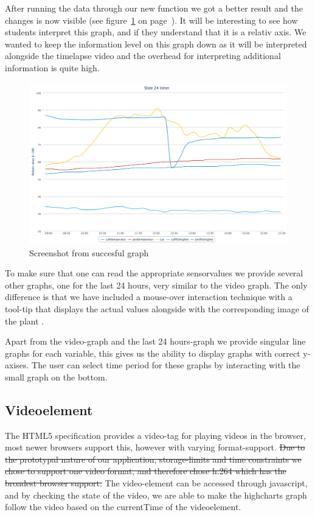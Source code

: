 After running the data through our new function we got a better result and the changes is now visible (see figure~\ref{fig:goodgraph} on page~\pageref{fig:goodgraph}). It will be interesting to see how students interpret this graph, and if they understand that it is a relativ axis. We wanted to keep the information level on this graph down as it will be interpreted alongside the timelapse video and the overhead for interpreting additional information is quite high.  

\begin{figure}
\centering
\includegraphics[width=1\textwidth]{img/interface/goodgraph.png}
\caption{Screenshot from succesful graph}
\label{fig:goodgraph}
\end{figure}

To make sure that one can read the appropriate sensorvalues we provide several other graphs, one for the last 24 hours, very similar to the video graph. The only difference is that we have included a mouse-over interaction technique with a tool-tip that displays the actual values alongside with the corresponding image of the plant \citep[p.254]{kluge2010simulation}.

Apart from the video-graph and the last 24 hours-graph we provide singular line graphs for each variable, this gives us the ability to display graphs with correct y-axises. The user can select time period for these graphs by interacting with the small graph on the bottom. 

\subsection{Videoelement}
The HTML5 specification provides a video-tag for playing videos in the browser, most newer browsers support this, however with varying format-support. \sout{Due to the prototypal nature of our application, storage-limits and time constraints we chose to support one video format, and therefore chose h.264 which has the broadest browser support.} The video-element can be accessed through javascript, and by checking the state of the video, we are able to make the highcharts graph follow the video based on the currentTime of the videoelement.

